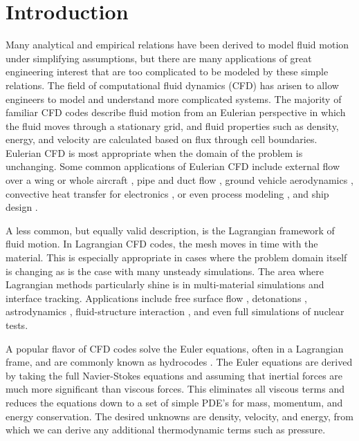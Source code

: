 
\chapter{Introduction} %
\label{Chapter1}

Many analytical and empirical relations have been derived to model fluid motion under simplifying assumptions, but there are many applications of great engineering interest that are too complicated to be modeled by these simple relations. The field of computational fluid dynamics (CFD) has arisen to allow engineers to model and understand more complicated systems. The majority of familiar CFD codes describe fluid motion from an Eulerian perspective in which the fluid moves through a stationary grid, and fluid properties such as density, energy, and velocity are calculated based on flux through cell boundaries. Eulerian CFD \cite{Tannehill1997} is most appropriate when the domain of the problem is unchanging. Some common applications of Eulerian CFD include external flow over a wing or whole aircraft \cite{AircraftCFD}, pipe and duct flow \cite{DuctCFD}, ground vehicle aerodynamics \cite{Perry2008}, convective heat transfer for electronics \cite{ElectronicsCFD}, or even process modeling \cite{SugarCFD}, and ship design \cite{ShipCFD}.

A less common, but equally valid description, is the Lagrangian framework of fluid motion. In Lagrangian CFD codes, the mesh moves in time with the material. This is especially appropriate in cases where the problem domain itself is changing as is the case with many unsteady simulations. The area where Lagrangian methods particularly shine is in multi-material simulations and interface tracking. Applications include free surface flow \cite{FreeSurfaceCFD, FreeSurfaceCFD2}, detonations \cite{ExplosionCFD}, astrodynamics \cite{AstroCFD}, fluid-structure interaction \cite{FluidStructureCFD}, and even full simulations of nuclear tests. 

A popular flavor of CFD codes solve the Euler equations, often in a Lagrangian frame, and are commonly known as hydrocodes \cite{HydroCodeBook}. The Euler equations are derived by taking the full Navier-Stokes equations and assuming that inertial forces are much more significant than viscous forces. This eliminates all viscous terms and reduces the equations down to a set of simple PDE's for mass, momentum, and energy conservation. The desired unknowns are density, velocity, and energy, from which we can derive any additional thermodynamic terms such as pressure. 

